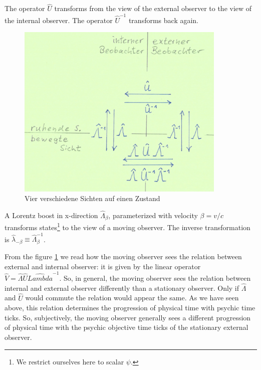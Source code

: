 \documentclass[12pt]{article}
\begin{document}
The operator $\hat{U}$ transforms from the view of the external observer to the view of the internal observer. The operator $\hat{U}^{-1}$ transforms back again.
\begin{figure}[!h]\begin{center}
  \includegraphics[width=10cm]{Bewegte_Uhr.png}
  \caption{Vier verschiedene Sichten auf einen Zustand}
  \label{fig:moved_clock}
\end{center}\end{figure}

A Lorentz boost in x-direction $\hat{\Lambda}_\beta$, parameterized with velocity $\beta=v/c$ transforms states\footnote{We restrict ourselves here to scalar $\psi$.} to the view of a moving observer. The inverse transformation is $\hat{\lambda}_{-\beta} \equiv \hat{\Lambda}_{\beta}^{-1}$.

From the figure \ref{fig:moved_clock} we read how the moving observer sees the relation between external and internal observer: it is given by the linear operator $\hat{V} = \hat{\Lambda} \hat{U} \hat{Lambda}^{-1}$. So, in general, the moving observer sees the relation between internal and external observer differently than a stationary observer. Only if $\hat{\Lambda}$ and $\hat{U}$ would commute the relation would appear the same. As we have seen above, this relation determines the progression of physical time with psychic time ticks. So, subjectively, the moving observer generally sees a different progression of physical time with the psychic objective time ticks of the stationary external observer.
\end{document}
